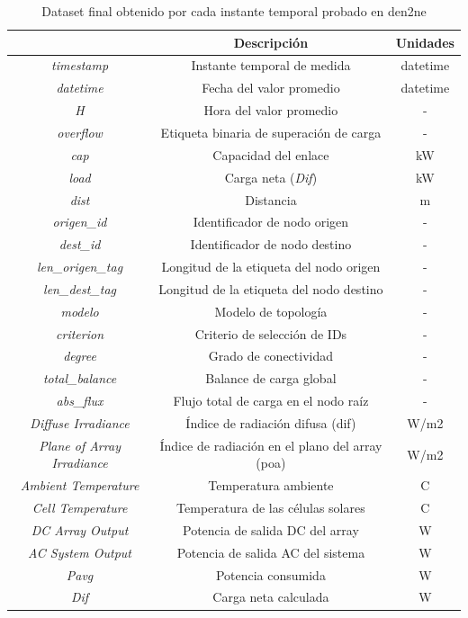 \vspace{3mm}

\begin{table}[h!]
    \centering
    \begin{tabular}{|c|c|c|}
    \hline
    \rowcolor[HTML]{AAAAAA} 
    \multicolumn{1}{|c|}{\cellcolor[HTML]{AAAAAA}Campo} & \multicolumn{1}{c|}{\cellcolor[HTML]{AAAAAA}Descripción} & Unidades \\ \hline
    \textit{timestamp} & Instante temporal de medida & datetime \\ \hline
    \textit{datetime} & Fecha del valor promedio & datetime \\ \hline
    \textit{H} & Hora del valor promedio & - \\ \hline
    \textit{overflow} & Etiqueta binaria de superación de carga & - \\ \hline
    \textit{cap} & Capacidad del enlace & kW \\ \hline
    \textit{load} & Carga neta (\textit{Dif}) & kW \\ \hline
    \textit{dist} & Distancia & m \\ \hline
    \textit{origen\_id} & Identificador de nodo origen & - \\ \hline
    \textit{dest\_id} & Identificador de nodo destino & - \\ \hline
    \textit{len\_origen\_tag} & Longitud de la etiqueta del nodo origen & - \\ \hline
    \textit{len\_dest\_tag} & Longitud de la etiqueta del nodo destino & - \\ \hline
    \textit{modelo} & Modelo de topología & - \\ \hline
    \textit{criterion} & Criterio de selección de IDs & - \\ \hline
    \textit{degree} & Grado de conectividad & - \\ \hline
    \textit{total\_balance} & Balance de carga global & - \\ \hline
    \textit{abs\_flux} & Flujo total de carga en el nodo raíz & - \\ \hline
    \textit{Diffuse Irradiance} & Índice de radiación difusa (\gls{dif}) & W/m2 \\ \hline
    \textit{Plane of Array Irradiance} & Índice de radiación en el plano del array (\acrshort{poa}) & W/m2 \\ \hline 
    \textit{Ambient Temperature} & Temperatura ambiente & C \\ \hline
    \textit{Cell Temperature} & Temperatura de las células solares & C \\ \hline
    \textit{DC Array Output} & Potencia de salida DC del array & W \\ \hline
    \textit{AC System Output} & Potencia de salida AC del sistema & W \\ \hline
    \textit{Pavg} & Potencia consumida & W \\ \hline
    \textit{Dif} & Carga neta calculada & W \\ \hline
    \end{tabular}  
    \caption{Dataset final obtenido por cada instante temporal probado en \acrshort{den2ne}}
    \label{tab:datafinal}
\end{table}

